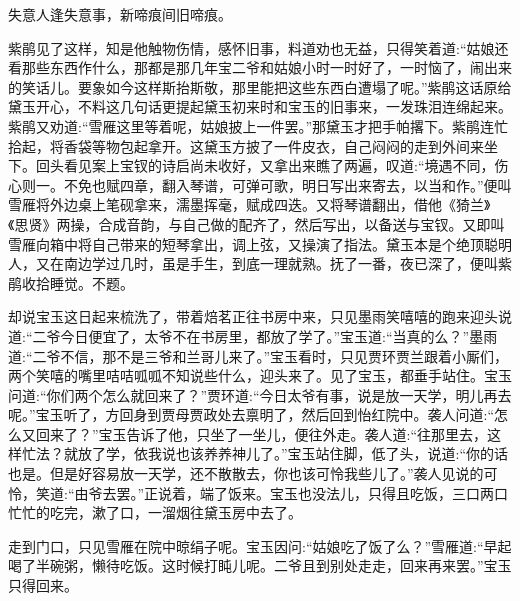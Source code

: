 \begin{poem}
    \begin{pl}
        失意人逢失意事，新啼痕间旧啼痕。
    \end{pl}
\end{poem}


\begin{parag}
    紫鹃见了这样，知是他触物伤情，感怀旧事，料道劝也无益，只得笑着道:“姑娘还看那些东西作什么，那都是那几年宝二爷和姑娘小时一时好了，一时恼了，闹出来的笑话儿。要象如今这样斯抬斯敬，那里能把这些东西白遭塌了呢。”紫鹃这话原给黛玉开心，不料这几句话更提起黛玉初来时和宝玉的旧事来，一发珠泪连绵起来。紫鹃又劝道:“雪雁这里等着呢，姑娘披上一件罢。”那黛玉才把手帕撂下。紫鹃连忙拾起，将香袋等物包起拿开。这黛玉方披了一件皮衣，自己闷闷的走到外间来坐下。回头看见案上宝钗的诗启尚未收好，又拿出来瞧了两遍，叹道:“境遇不同，伤心则一。不免也赋四章，翻入琴谱，可弹可歌，明日写出来寄去，以当和作。”便叫雪雁将外边桌上笔砚拿来，濡墨挥毫，赋成四迭。又将琴谱翻出，借他《猗兰》《思贤》两操，合成音韵，与自己做的配齐了，然后写出，以备送与宝钗。又即叫雪雁向箱中将自己带来的短琴拿出，调上弦，又操演了指法。黛玉本是个绝顶聪明人，又在南边学过几时，虽是手生，到底一理就熟。抚了一番，夜已深了，便叫紫鹃收拾睡觉。不题。
\end{parag}


\begin{parag}
    却说宝玉这日起来梳洗了，带着焙茗正往书房中来，只见墨雨笑嘻嘻的跑来迎头说道:“二爷今日便宜了，太爷不在书房里，都放了学了。”宝玉道:“当真的么？”墨雨道:“二爷不信，那不是三爷和兰哥儿来了。”宝玉看时，只见贾环贾兰跟着小厮们，两个笑嘻的嘴里咭咭呱呱不知说些什么，迎头来了。见了宝玉，都垂手站住。宝玉问道:“你们两个怎么就回来了？”贾环道:“今日太爷有事，说是放一天学，明儿再去呢。”宝玉听了，方回身到贾母贾政处去禀明了，然后回到怡红院中。袭人问道:“怎么又回来了？”宝玉告诉了他，只坐了一坐儿，便往外走。袭人道:“往那里去，这样忙法？就放了学，依我说也该养养神儿了。”宝玉站住脚，低了头，说道:“你的话也是。但是好容易放一天学，还不散散去，你也该可怜我些儿了。”袭人见说的可怜，笑道:“由爷去罢。”正说着，端了饭来。宝玉也没法儿，只得且吃饭，三口两口忙忙的吃完，漱了口，一溜烟往黛玉房中去了。
\end{parag}


\begin{parag}
    走到门口，只见雪雁在院中晾绢子呢。宝玉因问:“姑娘吃了饭了么？”雪雁道:“早起喝了半碗粥，懒待吃饭。这时候打盹儿呢。二爷且到别处走走，回来再来罢。”宝玉只得回来。
\end{parag}


